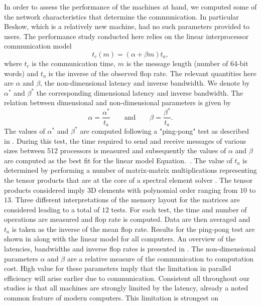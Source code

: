 \documentclass{sig-alternate}
\begin{document}
In order to assess the performance of the machines at hand, we computed  some of the network characteristics that determine the communication. In particular Beskow, which is a relatively new machine, had no such parameters provided to users. 
The performance study conducted here relies on the linear interprocessor communication  model
\begin{equation}
 t_c(m) = (\alpha + \beta m) t_a,\label{eqn:lincomm}
\end{equation}
where $t_c$ is the communication time, $m$ is the message length (number of
64-bit words) and $t_a$ is the inverse of the observed flop rate. The relevant
quantities here are $\alpha$ and $\beta$, the non-dimensional latency and inverse
 bandwidth. We denote by $\alpha^*$ and $\beta^*$ the corresponding dimensional 
latency and inverse bandwidth. The relation between dimensional and non-dimensional parameters is given by
\begin{equation*}
\alpha = \frac{\alpha^*}{t_a} \qquad \text{and} \qquad \beta = \frac{\beta^*}{t_a}.
\end{equation*}
The values of $\alpha^*$ and $\beta^*$ are computed following a "ping-pong" test 
as described in \cite{fischer:scaling}. During this test, the time required to 
send and receive messages of various sizes between 512 processors is measured 
and subsequently the values of $\alpha$ and $\beta$ are computed as the best fit 
for the linear model Equation.~. The value of $t_a$ is determined by 
performing a number of matrix-matrix multiplications representing the tensor products
 that are at the core of a spectral element solver \cite{fischer:hom}. The tensor
 products considered imply 3D elements with polynomial order ranging from $10$ to $13$.
 Three different interpretations of the memory layout for the matrices are considered 
leading to a total of $12$ tests. For each test, the time and number of operations are
 measured and flop rate is computed. Data are then averaged and $t_a$ is taken as the
 inverse of the mean flop rate. Results for the ping-pong test are shown in 
 along with the linear model for all computers. An overview 
of the latencies, bandwidths and inverse flop rates is presented in 
. The non-dimensional parameters $\alpha$ and $\beta$ are 
a relative measure of the communication to computation cost. High value for these
parameters imply that the limitation in parallel efficiency will arise earlier due to communication. Consistent all throughout our studies is   that all machines are strongly limited by the latency, already a noted common feature of modern computers. This limitation is strongest on
\end{document}
